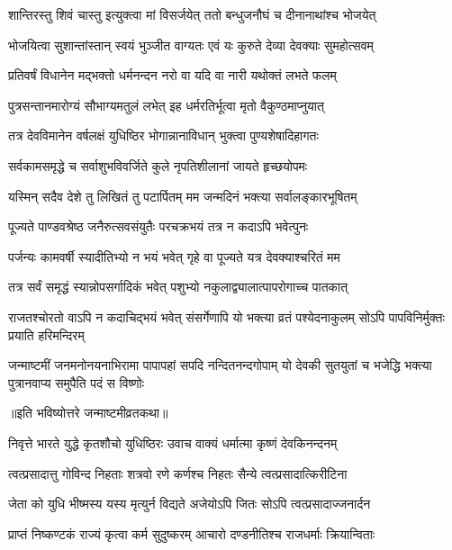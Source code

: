 \twolineshloka
{शान्तिरस्तु शिवं चास्तु इत्युक्त्वा मां विसर्जयेत्}
{ततो बन्धुजनौघं च दीनानाथांश्च भोजयेत्}%


\twolineshloka
{भोजयित्वा सुशान्तांस्तान् स्वयं भुञ्जीत वाग्यतः}
{एवं यः कुरुते देव्या देवक्याः सुमहोत्सवम्}%


\twolineshloka
{प्रतिवर्षं विधानेन मद्भक्तो धर्मनन्दन}
{नरो वा यदि वा नारी यथोक्तं लभते फलम्}%


\twolineshloka
{पुत्रसन्तानमारोग्यं सौभाग्यमतुलं लभेत्}
{इह धर्मरतिर्भूत्वा मृतो वैकुण्ठमाप्नुयात्}%


\twolineshloka
{तत्र देवविमानेन वर्षलक्षं युधिष्ठिर}
{भोगान्नानाविधान् भुक्त्वा पुण्यशेषादिहागतः}%


\twolineshloka
{सर्वकामसमृद्धे च सर्वाशुभविवर्जिते}
{कुले नृपतिशीलानां जायते हृच्छयोपमः}%


\twolineshloka
{यस्मिन् सदैव देशे तु लिखितं तु पटार्पितम्}
{मम जन्मदिनं भक्त्या सर्वालङ्कारभूषितम्}%


\twolineshloka
{पूज्यते पाण्डवश्रेष्ठ जनैरुत्सवसंयुतैः}
{परचक्रभयं तत्र न कदाऽपि भवेत्पुनः}%


\twolineshloka
{पर्जन्यः कामवर्षी स्यादीतिभ्यो न भयं भवेत्}
{गृहे वा पूज्यते यत्र देवक्याश्चरितं मम}%


\twolineshloka
{तत्र सर्वं समृद्धं स्यान्नोपसर्गादिकं भवेत्}
{पशुभ्यो नकुलाद्व्यालात्पापरोगाच्च पातकात्}%

\threelineshloka
{राजतश्चोरतो वाऽपि न कदाचिद्भयं भवेत्}
{संसर्गेणापि यो भक्त्या व्रतं पश्येदनाकुलम्}
{सोऽपि पापविनिर्मुक्तः प्रयाति हरिमन्दिरम्}%

\fourlineindentedshloka
{जन्माष्टमीं जनमनोनयनाभिरामा}
{पापापहां सपदि नन्दितनन्दगोपाम्}
{यो देवकी सुतयुतां च भजेद्धि भक्त्या}
{पुत्रानवाप्य समुपैति पदं स विष्णोः}%

\centerline{॥इति भविष्योत्तरे जन्माष्टमीव्रतकथा॥}




\twolineshloka
{निवृत्ते भारते युद्धे कृतशौचो युधिष्ठिरः}
{उवाच वाक्यं धर्मात्मा कृष्णं देवकिनन्दनम्}%

\twolineshloka
{त्वत्प्रसादात्तु गोविन्द निहताः शत्रवो रणे}
{कर्णश्च निहतः सैन्ये त्वत्प्रसादात्किरीटिना}%

\twolineshloka
{जेता को युधि भीष्मस्य यस्य मृत्युर्न विद्यते}
{अजेयोऽपि जितः सोऽपि त्वत्प्रसादाज्जनार्दन}%

\twolineshloka
{प्राप्तं निष्कण्टकं राज्यं कृत्वा कर्म सुदुष्करम्}
{आचारो दण्डनीतिश्च राजधर्माः क्रियान्विताः}%

